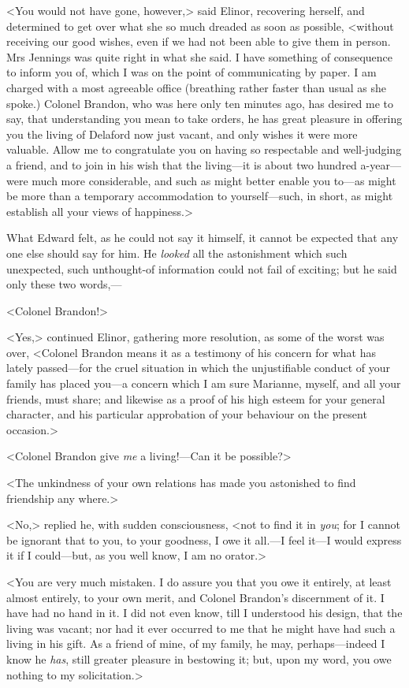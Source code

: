 <You would not have gone, however,> said Elinor, recovering herself, and determined to get over what she so much dreaded as soon as possible, <without receiving our good wishes, even if we had not been able to give them in person. Mrs Jennings was quite right in what she said. I have something of consequence to inform you of, which I was on the point of communicating by paper. I am charged with a most agreeable office (breathing rather faster than usual as she spoke.) Colonel Brandon, who was here only ten minutes ago, has desired me to say, that understanding you mean to take orders, he has great pleasure in offering you the living of Delaford now just vacant, and only wishes it were more valuable. Allow me to congratulate you on having so respectable and well-judging a friend, and to join in his wish that the living—it is about two hundred a-year—were much more considerable, and such as might better enable you to—as might be more than a temporary accommodation to yourself—such, in short, as might establish all your views of happiness.>

What Edward felt, as he could not say it himself, it cannot be expected that any one else should say for him. He \textit{looked} all the astonishment which such unexpected, such unthought-of information could not fail of exciting; but he said only these two words,—

<Colonel Brandon!>

<Yes,> continued Elinor, gathering more resolution, as some of the worst was over, <Colonel Brandon means it as a testimony of his concern for what has lately passed—for the cruel situation in which the unjustifiable conduct of your family has placed you—a concern which I am sure Marianne, myself, and all your friends, must share; and likewise as a proof of his high esteem for your general character, and his particular approbation of your behaviour on the present occasion.>

<Colonel Brandon give \textit{me} a living!—Can it be possible?>

<The unkindness of your own relations has made you astonished to find friendship any where.>

<No,> replied he, with sudden consciousness, <not to find it in \textit{you}; for I cannot be ignorant that to you, to your goodness, I owe it all.—I feel it—I would express it if I could—but, as you well know, I am no orator.>

<You are very much mistaken. I do assure you that you owe it entirely, at least almost entirely, to your own merit, and Colonel Brandon's discernment of it. I have had no hand in it. I did not even know, till I understood his design, that the living was vacant; nor had it ever occurred to me that he might have had such a living in his gift. As a friend of mine, of my family, he may, perhaps—indeed I know he \textit{has}, still greater pleasure in bestowing it; but, upon my word, you owe nothing to my solicitation.>

